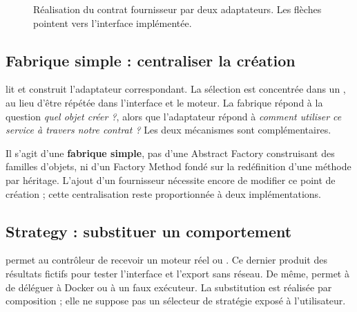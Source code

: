 \begin{figure}[H]
\centering
{}
\caption{Réalisation du contrat fournisseur par deux adaptateurs. Les flèches pointent vers l'interface implémentée.}
\end{figure}

\subsection{Fabrique simple : centraliser la création}
 lit  et construit l'adaptateur correspondant. La sélection est concentrée dans un , au lieu d'être répétée dans l'interface et le moteur. La fabrique répond à la question \emph{quel objet créer ?}, alors que l'adaptateur répond à \emph{comment utiliser ce service à travers notre contrat ?} Les deux mécanismes sont complémentaires.

Il s'agit d'une \textbf{fabrique simple}, pas d'une Abstract Factory construisant des familles d'objets, ni d'un Factory Method fondé sur la redéfinition d'une méthode par héritage. L'ajout d'un fournisseur nécessite encore de modifier ce point de création ; cette centralisation reste proportionnée à deux implémentations.

\subsection{Strategy : substituer un comportement}
 permet au contrôleur de recevoir un moteur réel ou . Ce dernier produit des résultats fictifs pour tester l'interface et l'export sans réseau. De même,  permet à  de déléguer à Docker ou à un faux exécuteur. La substitution est réalisée par composition ; elle ne suppose pas un sélecteur de stratégie exposé à l'utilisateur.

